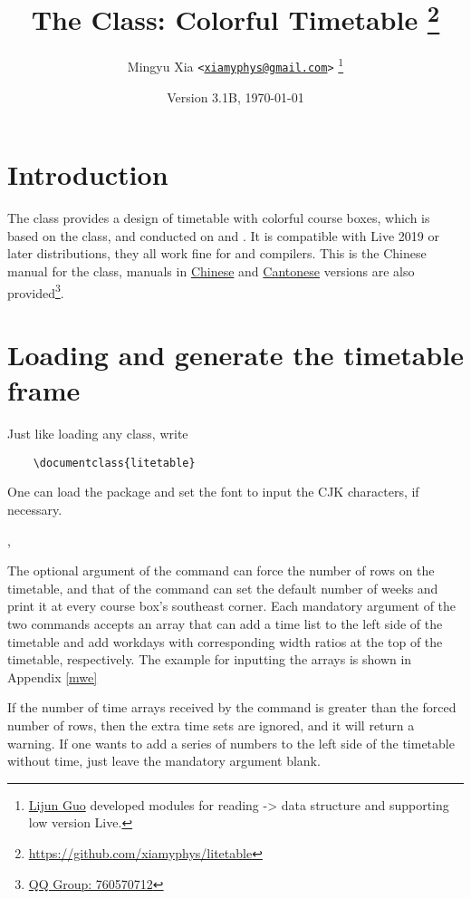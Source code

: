 \documentclass[letterpaper]{l3doc}
\title
{
  \bfseries
  The \cls{litetable} Class: Colorful Timetable
  \thanks{\url{https://github.com/xiamyphys/litetable}}
}
\author
{
  Mingyu Xia \texttt{<\href{mailto:xiamyphys@gmail.com}{xiamyphys@gmail.com}>}
  \thanks{\href{https://github.com/ljguo1020}{Lijun Guo} developed modules for reading \meta{left} -> \meta{right} data structure and supporting low version \hologo {TeX} Live.}
}
\date{Version 3.1B, \today}
\begin{document}
\maketitle

\section{Introduction}

The  class provides a design of timetable with colorful course boxes, which is based on the  class, and conducted on  and . It is compatible with Live 2019 or later distributions, they all work fine for  and  compilers. This is the Chinese manual for the  class, manuals in \href{./litetable-cn.pdf}{Chinese} and \href{./litetable-hk.pdf}{Cantonese} versions are also provided\footnote{\href{https://qm.qq.com/q/RyssAhG4qy}{QQ Group: 760570712}}.

\section{Loading  and generate the timetable frame}

Just like loading any class, write

\begin{framed}
  \begin{verbatim}
    \documentclass{litetable}
  \end{verbatim}
\end{framed}

One can load the  package and set the font to input the CJK characters, if necessary.

\begin{function}{\timelist,\weeklist}
  \begin{syntax}
                 
        
  \end{syntax}

  The optional argument of the command  can force the number of rows on the timetable, and that of the command  can set the default number of weeks and print it at every course box's southeast corner. Each mandatory argument of the two commands accepts an array that can add a time list to the left side of the timetable and add workdays with corresponding width ratios at the top of the timetable, respectively. The example for inputting the arrays is shown in Appendix \ref{mwe}

  If the number of time arrays received by the command  is greater than the forced number of rows, then the extra time sets are ignored, and it will return a warning. If one wants to add a series of numbers to the left side of the timetable without time, just leave the mandatory argument blank.
\end{function}
\end{document}
